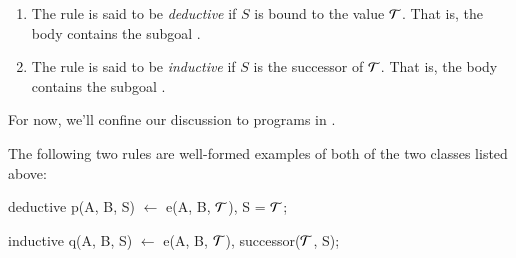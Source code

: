 \begin{enumerate}

\item The rule is said to be \emph{deductive} if $S$ is
bound to the value $\Tau$.  That is, the body contains the subgoal
.

\item The rule is said to be {\em inductive} if $S$ is the successor
of $\Tau$.  That is, the body contains the subgoal
.



\end{enumerate}

For now, we'll confine our discussion to programs in \slang. 

\begin{example}

The following two rules are well-formed examples of both of the two classes
listed above:

\begin{Dedalus}
deductive
p(A, B, S) \(\leftarrow\)
  e(A, B, \(\Tau\)),
  S = \(\Tau\);

inductive 
q(A, B, S) \(\leftarrow\)
  e(A, B, \(\Tau\)),
  successor(\(\Tau\), S);

\end{Dedalus}

\end{example}

